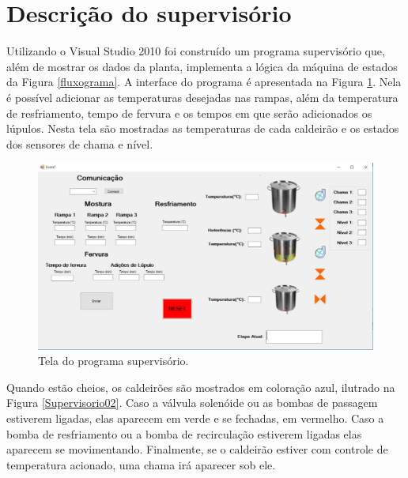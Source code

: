 		\section{Descrição do supervisório}

Utilizando o Visual Studio 2010 foi construído um programa supervisório que, além de mostrar os dados da planta, implementa a lógica da máquina de estados da Figura  \ref{fluxograma}. A interface do programa é apresentada na Figura \ref{Supervisorio}. Nela é possível adicionar as temperaturas desejadas nas rampas, além da temperatura de resfriamento, tempo de fervura e os tempos em que serão adicionados os lúpulos. Nesta tela são mostradas as temperaturas de cada caldeirão e os estados dos sensores de chama e nível.

\begin{figure}[htb]
	\caption{\label{Supervisorio}Tela do programa supervisório.}
	\begin{center}
	    \includegraphics[width=0.95\linewidth]{./img/Supervisorio.jpg}
	\end{center}
\end{figure}

Quando estão cheios, os caldeirões são mostrados em coloração azul, ilutrado na Figura \ref{Supervisorio02}. Caso a válvula solenóide ou as bombas de passagem estiverem ligadas, elas aparecem em verde e se fechadas, em vermelho. Caso a bomba de resfriamento ou a bomba de recirculação estiverem ligadas elas aparecem se movimentando. Finalmente, se o caldeirão estiver com controle de temperatura acionado, uma chama irá aparecer sob ele.

